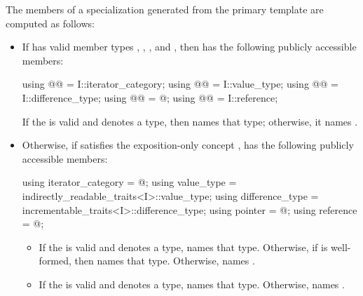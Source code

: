 \pnum
The members of a specialization  generated from the
 primary template are computed as follows:

\begin{itemize}
\item
If  has valid member
types , ,
, and ,
then
has the following publicly accessible members:
\begin{codeblock}
using @@ = I::iterator_category;
using @@        = I::value_type;
using @@   = I::difference_type;
using @@           = @\seebelow@;
using @@         = I::reference;
\end{codeblock}
If the   is valid and
denotes a type, then  names that type;
otherwise, it names .

\item
Otherwise, if  satisfies the exposition-only concept
,
 has the following
publicly accessible members:
\begin{codeblock}
using iterator_category = @\seebelow@;
using value_type        = indirectly_readable_traits<I>::value_type;
using difference_type   = incrementable_traits<I>::difference_type;
using pointer           = @\seebelow@;
using reference         = @\seebelow@;
\end{codeblock}
\begin{itemize}
\item If the   is valid and denotes a type,
 names that type. Otherwise, if
 is well-formed, then
 names that type. Otherwise, 
names .

\item If the   is valid and denotes a
type,  names that type. Otherwise, 
names .


\end{itemize}
\end{itemize}
